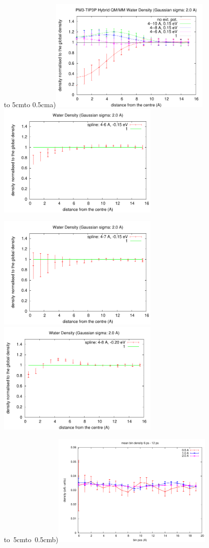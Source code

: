 \documentclass[11pt]{revtex4}
\begin{document}
\begin{figure}
\centerline{\vbox to 5cm{\hbox to 0.5cm{a)}\vfil}\includegraphics[width=8cm]{PM3_hybrid_4-X_0_15eV_depth_norm}
\includegraphics[width=8cm]{LDA_density_4-6_0_15eV}}
\centerline{\includegraphics[width=8cm]{LDA_density_4-7_0_15eV}
\includegraphics[width=8cm]{LDA_density_4-8_0_20eV}}
\hbox{\vbox to 5cm{\hbox to 0.5cm{b)}\vfil}\includegraphics[width=8cm]{radial_mean_new_6_12_ps}\hfil}

\end{figure}
\end{document}
